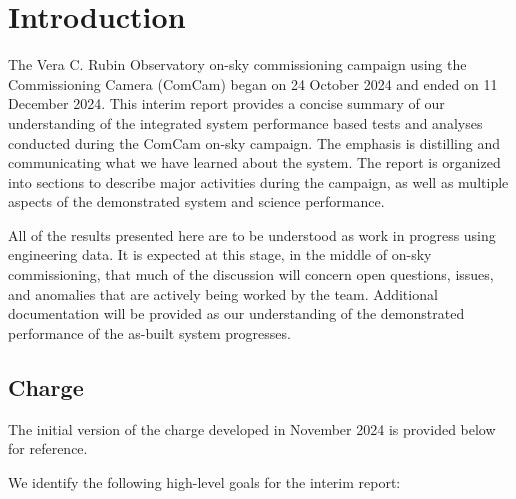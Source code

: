 \section{Introduction}
\label{sec:introduction}

The Vera C. Rubin Observatory on-sky commissioning campaign using the Commissioning Camera (ComCam) began on 24 October 2024 and ended on 11 December 2024.
This interim report provides a concise summary of our understanding of the integrated system performance based tests and analyses conducted during the ComCam on-sky campaign.
The emphasis is distilling and communicating what we have learned about the system.
The report is organized into sections to describe major activities during the campaign, as well as multiple aspects of the demonstrated system and science performance.

\begin{warning}
All of the results presented here are to be understood as work in progress using engineering data.
It is expected at this stage, in the middle of on-sky commissioning, that much of the discussion will concern open questions, issues, and anomalies that are actively being worked by the team.
Additional documentation will be provided as our understanding of the demonstrated performance of the as-built system progresses.
\end{warning}

\subsection{Charge}

\begin{note}
    The initial version of the charge developed in November 2024 is provided below for reference.
\end{note}

We identify the following high-level goals for the interim report:

